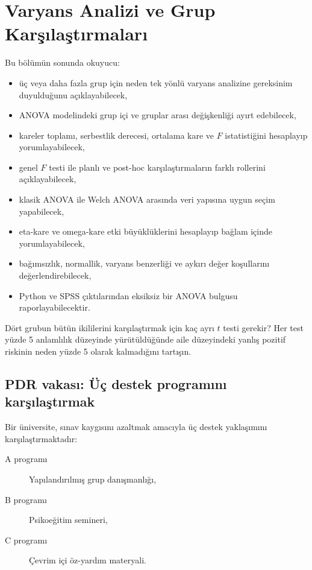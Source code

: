 \chapter{Varyans Analizi ve Grup Karşılaştırmaları}

\begin{hedefler}
Bu bölümün sonunda okuyucu:
\begin{itemize}
  \item üç veya daha fazla grup için neden tek yönlü varyans analizine gereksinim duyulduğunu açıklayabilecek,
  \item ANOVA modelindeki grup içi ve gruplar arası değişkenliği ayırt edebilecek,
  \item kareler toplamı, serbestlik derecesi, ortalama kare ve $F$ istatistiğini hesaplayıp yorumlayabilecek,
  \item genel $F$ testi ile planlı ve post-hoc karşılaştırmaların farklı rollerini açıklayabilecek,
  \item klasik ANOVA ile Welch ANOVA arasında veri yapısına uygun seçim yapabilecek,
  \item eta-kare ve omega-kare etki büyüklüklerini hesaplayıp bağlam içinde yorumlayabilecek,
  \item bağımsızlık, normallik, varyans benzerliği ve aykırı değer koşullarını değerlendirebilecek,
  \item Python ve SPSS çıktılarından eksiksiz bir ANOVA bulgusu raporlayabilecektir.
\end{itemize}
\end{hedefler}

\begin{hazirlik}
Dört grubun bütün ikililerini karşılaştırmak için kaç ayrı $t$ testi gerekir?
Her test yüzde 5 anlamlılık düzeyinde yürütüldüğünde aile düzeyindeki yanlış
pozitif riskinin neden yüzde 5 olarak kalmadığını tartışın.
\end{hazirlik}

\section{PDR vakası: Üç destek programını karşılaştırmak}

Bir üniversite, sınav kaygısını azaltmak amacıyla üç destek yaklaşımını
karşılaştırmaktadır:

\begin{description}
  \item[A programı] Yapılandırılmış grup danışmanlığı,
  \item[B programı] Psikoeğitim semineri,
  \item[C programı] Çevrim içi öz-yardım materyali.
\end{description}


